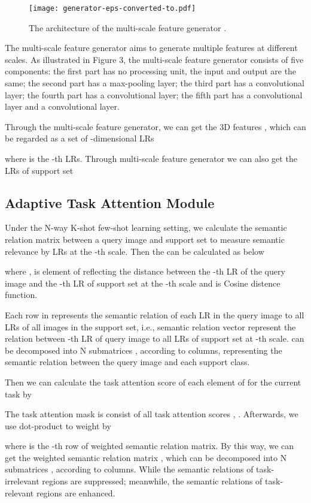 \documentclass[final]{cvpr}
\begin{document}
	\begin{figure}[t]
		\centering
		\texttt{[image: generator-eps-converted-to.pdf]}
		\caption{The architecture of the multi-scale feature generator . }
		\label{generator}
	\end{figure}
	
	The multi-scale feature generator aims to generate multiple features at different scales. As illustrated in Figure 3, the multi-scale feature generator consists of five components: the first part has no processing unit, the input and output are the same; the second part has a  max-pooling layer; the third part has a  convolutional layer; the fourth part has a  convolutional layer; the fifth part has a  convolutional layer and a  convolutional layer. 
	
	Through the multi-scale feature generator, we can get the 3D features  , which can be regarded as a set of  -dimensional LRs
	
	where  is the -th LRs. Through multi-scale feature generator we can also get the LRs of support set  
	
	
	\subsection{Adaptive Task Attention Module}
	Under the N-way K-shot few-shot learning setting, we calculate the semantic relation matrix  between a query image  and support set  to measure semantic relevance by LRs at the -th scale. Then the  can be calculated as below
	
	where ,   is  element of  reflecting the distance between the -th LR of the query image and the -th LR of support set at the -th scale and  is Cosine  distence function. 
	
	Each row in  represents the semantic relation of each LR in the query image to all LRs of all images in the support set, i.e., semantic relation vector   represent the relation between -th LR of query image  to all  LRs of support set at -th scale.  can be decomposed into N submatrices ,  according to columns, representing the semantic relation between the query image and each support class. 
	
	Then we can calculate the task attention score of each element of  for the current task by
	
	The task attention mask   is consist of all task attention scores , . Afterwards, we use dot-product to weight  by 
	
	where  is the -th row of weighted semantic relation matrix. By this way, we can get the weighted semantic relation matrix , which can be decomposed into N submatrices ,  according to columns. While the semantic relations of task-irrelevant regions are suppressed; meanwhile, the semantic relations of task-relevant regions are enhanced. 
	
\end{document}
